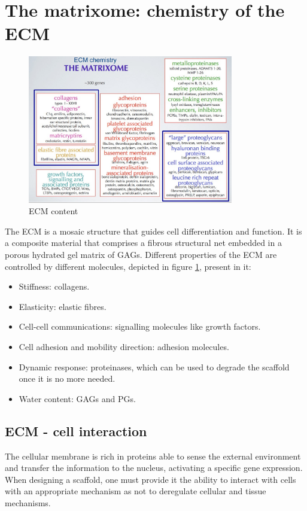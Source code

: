 \section{The matrixome: chemistry of the ECM}

\begin{figure}[ht]
	\centering
	\includegraphics[width=0.8\textwidth]{matrixome}
	\caption{ECM content}
	\label{fig:matrixome}
\end{figure}

The ECM is a mosaic structure that guides cell differentiation and function.
It is a composite material that comprises a fibrous structural net embedded in a porous hydrated gel matrix of GAGs.
Different properties of the ECM are controlled by different molecules, depicted in figure \ref{fig:matrixome}, present in it:

\begin{multicols}{2}
	\begin{itemize}
		\item Stiffness: collagens.
		\item Elasticity: elastic fibres.
		\item Cell-cell communications: signalling molecules like growth factors.
		\item Cell adhesion and mobility direction: adhesion molecules.
		\item Dynamic response: proteinases, which can be used to degrade the scaffold once it is no more needed.
		\item Water content: GAGs and PGs.
	\end{itemize}
\end{multicols}

	\subsection{ECM - cell interaction}
	The cellular membrane is rich in proteins able to sense the external environment and transfer the information to the nucleus, activating a specific gene expression.
	When designing a scaffold, one must provide it the ability to interact with cells with an appropriate mechanism as not to deregulate cellular and tissue mechanisms.

